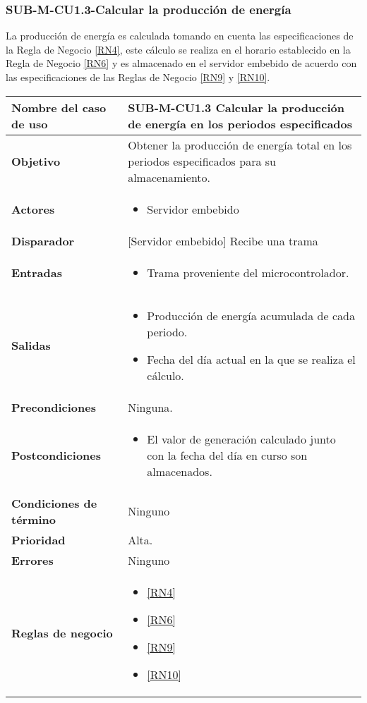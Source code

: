 \subsubsection{SUB-M-CU1.3-Calcular la producción de energía}\label{SUB-M-CU1.3}
La producción de energía es calculada tomando en cuenta las especificaciones de la Regla de Negocio \ref{RN4}, este cálculo se realiza en el horario establecido en la Regla de Negocio \ref{RN6} y es almacenado en el servidor embebido de acuerdo con las especificaciones de las Reglas de Negocio \ref{RN9} y \ref{RN10}.

\begin{longtable}{|J{5cm}|J{10.3cm}|}
	\hline
	\textbf{Nombre del caso de uso} &
		SUB-M-CU1.3 Calcular la producción de energía en los periodos especificados\\ \hline
	\textbf{Objetivo} &
		Obtener la producción de energía total en los periodos especificados para su almacenamiento. \\ \hline
	\textbf{Actores} &
		\begin{itemize}
		    \item Servidor embebido
		\end{itemize}\\ \hline 
	\textbf{Disparador} & 
	     {[Servidor embebido]} Recibe una trama\\ \hline 
	\textbf{Entradas} & 
		\begin{itemize}
				\item Trama proveniente del microcontrolador.
		\end{itemize}\\ \hline 
	\textbf{Salidas} & 
		\begin{itemize}
			\item Producción de energía acumulada de cada periodo.
			\item Fecha del día actual en la que se realiza el cálculo.
		\end{itemize} \\ \hline
	\textbf{Precondiciones} &
		Ninguna.\\ \hline
	\textbf{Postcondiciones} &
		\begin{itemize}
			\item El valor de generación calculado junto con la fecha del día en curso son almacenados.
		\end{itemize}\\ \hline
	\textbf{Condiciones de término} & 
		Ninguno \\ \hline 
	\textbf{Prioridad} & 
		Alta. \\ \hline
	\textbf{Errores} & 
	    Ninguno
		\\ \hline
	\textbf{Reglas de negocio} & 
		\begin{itemize}
			\item \ref{RN4}
			\item \ref{RN6}
			\item \ref{RN9}
			\item \ref{RN10}
		\end{itemize} \\ \hline

\end{longtable}

